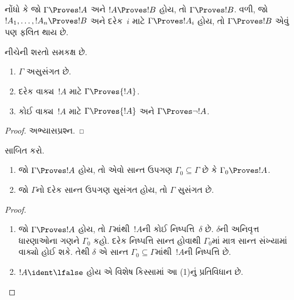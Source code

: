 નોંધો કે જો $\Gamma \Proves !A$ અને $!A \Proves !B$ હોય, તો
$\Gamma \Proves !B$. વળી, જો $!A_1, \dots, !A_n \Proves !B$ અને
દરેક~$i$ માટે $\Gamma \Proves !A_i$ હોય, તો $\Gamma \Proves !B$
એવું પણ ફલિત થાય છે.

\begin{prop}
નીચેની શરતો સમકક્ષ છે.
    \begin{enumerate}
      \item \( \Gamma \) અસુસંગત છે.
      \item દરેક વાક્ય~\( {!A} \) માટે \( \Gamma \Proves {!A} \).
      \item કોઈ વાક્ય~\( {!A} \) માટે \( \Gamma \Proves {!A} \) અને \( \Gamma \Proves \lnot {!A} \).
    \end{enumerate}
\end{prop}

\begin{proof}
અભ્યાસપ્રશ્ન.
\end{proof}

\begin{prob}
 સાબિત કરો.
\end{prob}



\begin{prop}[સઘનતા]
  \begin{enumerate}
  \item જો $\Gamma \Proves !A$ હોય, તો એવો સાન્ત ઉપગણ
    $\Gamma_0 \subseteq \Gamma$ છે કે $\Gamma_0 \Proves !A$.
  \item જો $\Gamma$નો દરેક સાન્ત ઉપગણ સુસંગત હોય, તો $\Gamma$ સુસંગત છે.
  \end{enumerate}
\end{prop}

\begin{proof}
  \begin{enumerate}
    \item જો $\Gamma \Proves !A$ હોય, તો $\Gamma$માંથી~$!A$ની કોઈ
      નિષ્પત્તિ~$\delta$ છે. $\delta$ની અનિવૃત્ત
      ધારણાઓના ગણને $\Gamma_0$ કહો. દરેક નિષ્પત્તિ સાન્ત હોવાથી
      $\Gamma_0$માં માત્ર સાન્ત સંખ્યામાં વાક્યો હોઈ શકે. તેથી
      $\delta$ એ સાન્ત $\Gamma_0 \subseteq \Gamma$માંથી~$!A$ની
      નિષ્પત્તિ છે.
    \item $!A \ident \lfalse$ હોય એ વિશેષ કિસ્સામાં આ (1)નું
      પ્રતિવિધાન છે.
  \end{enumerate}
\end{proof}
\endgroup



